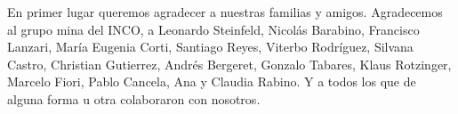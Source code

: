 
\begin{acknowledgments}

En primer lugar queremos agradecer a nuestras familias y amigos. Agradecemos al grupo mina del INCO, a Leonardo Steinfeld, Nicolás Barabino, Francisco Lanzari, María Eugenia Corti, Santiago Reyes, Viterbo Rodríguez, Silvana Castro, Christian Gutierrez, Andrés Bergeret, Gonzalo Tabares, Klaus Rotzinger, Marcelo Fiori, Pablo Cancela, Ana y Claudia Rabino. Y a todos los que de alguna forma u otra colaboraron con nosotros.

\end{acknowledgments}